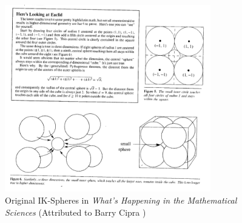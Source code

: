 
\centering
\begin{figure}[H]
    \centering
    \includegraphics[width=0.8\textwidth]{images/spheres.png}
    \caption{Original IK-Spheres in \textit{What's Happening in the Mathematical Sciences} (Attributed to Barry Cipra \cite{Cipra_1993})}
    \label{fig:my_label}
\end{figure}
